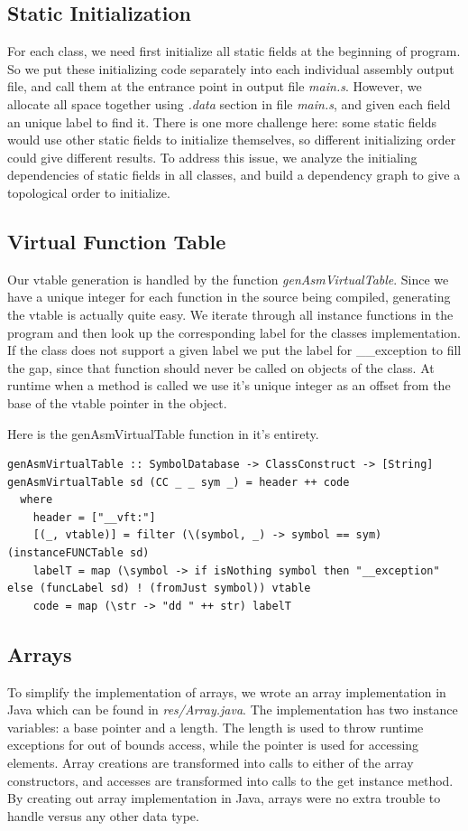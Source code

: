 \documentclass[12pt,letterpaper]{article}
\begin{document}
\subsection{Static Initialization}
For each class, we need first initialize all static fields at the beginning of program.
So we put these initializing code separately into each individual assembly output file, and call them at the entrance point in output file \emph{main.s}.
However, we allocate all space together using \emph{.data} section in file \emph{main.s}, and given each field an unique label to find it.
There is one more challenge here: some static fields would use other static fields to initialize themselves, so different initializing order could give different results.
To address this issue, we analyze the initialing dependencies of static fields in all classes, and build a dependency graph to give a topological order to initialize.

\subsection{Virtual Function Table}
Our vtable generation is handled by the function \emph{genAsmVirtualTable}.
Since we have a unique integer for each function in the source being compiled, generating the vtable is actually quite easy.
We iterate through all instance functions in the program and then look up the corresponding label for the classes implementation.
If the class does not support a given label we put the label for \_\_exception to fill the gap, since that function should never be called on objects of the class.
At runtime when a method is called we use it's unique integer as an offset from the base of the vtable pointer in the object.

Here is the genAsmVirtualTable function in it's entirety.
\begin{lstlisting}
genAsmVirtualTable :: SymbolDatabase -> ClassConstruct -> [String]
genAsmVirtualTable sd (CC _ _ sym _) = header ++ code
  where
    header = ["__vft:"]
    [(_, vtable)] = filter (\(symbol, _) -> symbol == sym) (instanceFUNCTable sd)
    labelT = map (\symbol -> if isNothing symbol then "__exception" else (funcLabel sd) ! (fromJust symbol)) vtable
    code = map (\str -> "dd " ++ str) labelT
\end{lstlisting}

\subsection{Arrays}
To simplify the implementation of arrays, we wrote an array implementation in Java which can be found in \emph{res/Array.java}.
The implementation has two instance variables: a base pointer and a length.
The length is used to throw runtime exceptions for out of bounds access, while the pointer is used for accessing elements.
Array creations are transformed into calls to either of the array constructors, and accesses are transformed into calls to the get instance method.
By creating out array implementation in Java, arrays were no extra trouble to handle versus any other data type.
\end{document}
